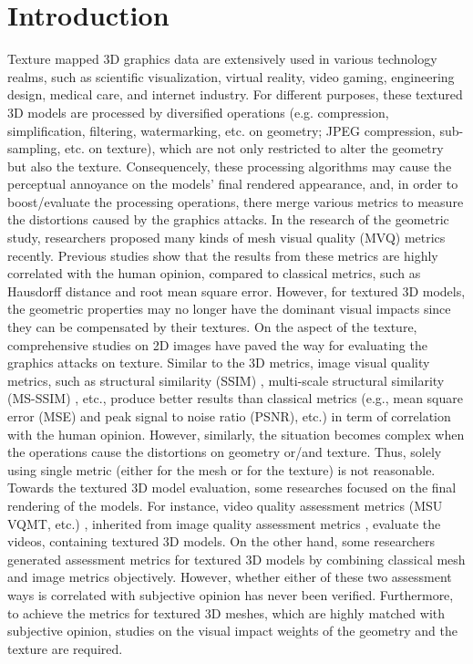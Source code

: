 \section{Introduction}
Texture mapped 3D graphics data are extensively used in various technology realms, such as scientific visualization, virtual reality, video gaming, engineering design, medical care, and internet industry. For different purposes, these textured 3D models are processed by diversified operations (e.g. compression, simplification, filtering, watermarking, etc. on geometry; JPEG compression, sub-sampling, etc. on texture), which are not only restricted to alter the geometry but also the texture. Consequencely, these processing algorithms may cause the perceptual annoyance on the models’ final rendered appearance, and, in order to boost/evaluate the processing operations, there merge various metrics to measure the distortions caused by the graphics attacks. In the research of the geometric study, researchers \cite{Lavou__2011}\cite{V_a_2012}\cite{Wang_2011} proposed many kinds of mesh visual quality (MVQ) metrics recently. Previous studies \cite{Corsini_2013}\cite{Guo_2015} show that the results from these metrics are highly correlated with the human opinion, compared to classical metrics, such as Hausdorff distance and root mean square error. However, for textured 3D models, the geometric properties may no longer have the dominant visual impacts since they can be compensated by their textures.  On the aspect of the texture, comprehensive studies on 2D images have paved the way for evaluating the graphics attacks on texture.  Similar to the 3D metrics, image visual quality metrics, such as structural similarity (SSIM) \cite{Wang_2004}, multi-scale structural similarity (MS-SSIM) \cite{Zhou_Wang_2011}, etc., produce better results than classical metrics (e.g., mean square error (MSE) and peak signal to noise ratio (PSNR), etc.) in term of correlation with the human opinion. However, similarly, the situation becomes complex when the operations cause the distortions on geometry or/and texture. Thus, solely using single metric (either for the mesh or for the texture) is not reasonable. Towards the textured 3D model evaluation, some researches focused on the final rendering of the models. For instance, video quality assessment metrics (MSU VQMT, etc.)  \cite{Seshadrinathan_2010}, inherited from image quality assessment metrics \cite{Wang_2006}, evaluate the videos, containing textured 3D models.  On the other hand, some researchers \cite{Tian_2004} generated assessment metrics for textured 3D models by combining classical mesh and image metrics objectively. However, whether either of these two assessment ways is correlated with subjective opinion has never been verified. Furthermore, to achieve the metrics for textured 3D meshes, which are highly matched with subjective opinion, studies on the visual impact weights of the geometry and the texture are required.\\
